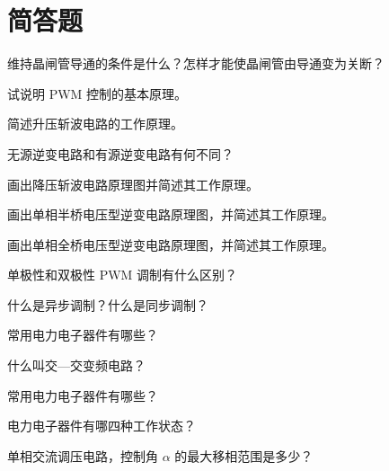 \documentclass[电力电子]{subfiles}
\begin{document}
\section{简答题}
\begin{ti}[5 分]
	维持晶闸管导通的条件是什么？怎样才能使晶闸管由导通变为关断？
\end{ti}

\begin{ti}[5 分]
	试说明 PWM 控制的基本原理。
\end{ti}

\begin{ti}[5 分]
	简述升压斩波电路的工作原理。
\end{ti}

\begin{ti}[5 分]
	无源逆变电路和有源逆变电路有何不同？
\end{ti}

\begin{ti}[10 分]
	画出降压斩波电路原理图并简述其工作原理。
\end{ti}

\begin{ti}[10 分]
	画出单相半桥电压型逆变电路原理图，并简述其工作原理。
\end{ti}

\begin{ti}[10 分]
	画出单相全桥电压型逆变电路原理图，并简述其工作原理。
\end{ti}

\begin{ti}[5 分]
	单极性和双极性 PWM 调制有什么区别？
\end{ti}

\begin{ti}[5 分]
	什么是异步调制？什么是同步调制？
\end{ti}

\begin{ti}[5 分]
	常用电力电子器件有哪些？
\end{ti}

\begin{ti}[5 分]
	什么叫交—交变频电路？
\end{ti}

\begin{ti}[5 分]
	常用电力电子器件有哪些？
\end{ti}

\begin{ti}[5 分]
	电力电子器件有哪四种工作状态？
\end{ti}

\begin{ti}[5 分]
	单相交流调压电路，控制角 $\alpha$ 的最大移相范围是多少？
\end{ti}
\end{document}
